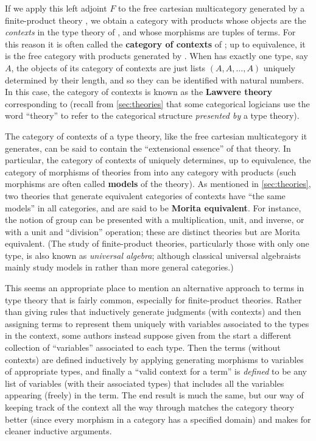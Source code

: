 If we apply this left adjoint $F$ to the free cartesian multicategory generated by a finite-product theory \cG, we obtain a category with products whose objects are the \emph{contexts} in the type theory of \cG, and whose morphisms are tuples of terms.
For this reason it is often called the \textbf{category of contexts} of \cG; up to equivalence, it is the free category with products generated by \cG.
When \cG has exactly one type, say $A$, the objects of its category of contexts are just lists $(A,A,\dots,A)$ uniquely determined by their length, and so they can be identified with natural numbers.
In this case, the category of contexts is known as the \textbf{Lawvere theory}~\cite{lawvere:functsem} corresponding to \cG (recall from \cref{sec:theories} that some categorical logicians use the word ``theory'' to refer to the categorical structure \emph{presented by} a type theory).

The category of contexts of a type theory, like the free cartesian multicategory it generates, can be said to contain the ``extensional essence'' of that theory.
In particular, the category of contexts of \cG uniquely determines, up to equivalence, the category of morphisms of theories from \cG into any category with products (such morphisms are often called \textbf{models} of the theory).
As mentioned in \cref{sec:theories}, two theories that generate equivalent categories of contexts have ``the same models'' in all categories, and are said to be \textbf{Morita equivalent}.
For instance, the notion of group can be presented with a multiplication, unit, and inverse, or with a unit and ``division'' operation; these are distinct theories but are Morita equivalent.
(The study of finite-product theories, particularly those with only one type, is also known as \emph{universal algebra}; although classical universal algebraists mainly study models in \bSet rather than more general categories.)

\begin{rmk}
  This seems an appropriate place to mention an alternative approach to terms in type theory that is fairly common, especially for finite-product theories.
  Rather than giving rules that inductively generate judgments (with contexts) and then assigning terms to represent them uniquely with variables associated to the types in the context, some authors instead suppose given from the start a different collection of ``variables'' associated to each type.
  Then the terms (without contexts) are defined inductively by applying generating morphisms to variables of appropriate types, and finally a ``valid context for a term'' is \emph{defined} to be any list of variables (with their associated types) that includes all the variables appearing (freely) in the term.
  The end result is much the same, but our way of keeping track of the context all the way through matches the category theory better (since every morphism in a category has a specified domain) and makes for cleaner inductive arguments.
\end{rmk}


